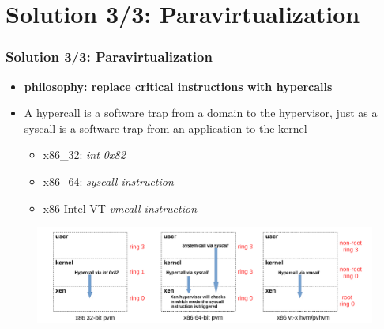 \documentclass[aspectratio=169]{beamer}
\begin{document}
\section{Solution 3/3: Paravirtualization}
\begin{frame}
\frametitle{Solution 3/3: Paravirtualization}
\begin{itemize}
\item \textbf{philosophy: replace critical instructions with hypercalls}
\item A hypercall is a software trap from a domain to the hypervisor, just as a syscall is a software trap from an application to the kernel
	\begin{itemize}
		\item x86\_32: \textit{int 0x82} 
		\item x86\_64: \textit{syscall instruction}
		\item x86 Intel-VT \textit{vmcall instruction}
	\end{itemize}
\end{itemize}
\begin{figure}
\includegraphics[width=1.0\linewidth]{figures/hypercall.pdf}
\end{figure}
\end{frame}


\end{document}

